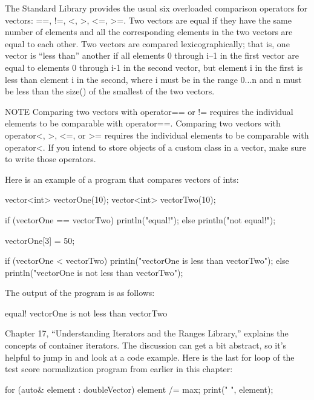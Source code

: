 
The Standard Library provides the usual six overloaded comparison operators for vectors: ==, !=, <, >, <=, >=. Two vectors are equal if they have the same number of elements and all the corresponding elements in the two vectors are equal to each other. Two vectors are compared lexicographically; that is, one vector is “less than” another if all elements 0 through i–1 in the first vector are equal to elements 0 through i-1 in the second vector, but element i in the first is less than element i in the second, where i must be in the range 0...n and n must be less than the size() of the smallest of the two vectors.

\begin{myNotic}{NOTE}
Comparing two vectors with operator== or != requires the individual elements to be comparable with operator==. Comparing two vectors with operator<, >, <=, or >= requires the individual elements to be comparable with operator<. If you intend to store objects of a custom class in a vector, make sure to write those operators.
\end{myNotic}

Here is an example of a program that compares vectors of ints:

\begin{cpp}
vector<int> vectorOne(10);
vector<int> vectorTwo(10);

if (vectorOne == vectorTwo) { println("equal!"); }
else { println("not equal!"); }

vectorOne[3] = 50;

if (vectorOne < vectorTwo) { println("vectorOne is less than vectorTwo"); }
else { println("vectorOne is not less than vectorTwo"); }
\end{cpp}

The output of the program is as follows:

\begin{shell}
equal!
vectorOne is not less than vectorTwo
\end{shell}


Chapter 17, “Understanding Iterators and the Ranges Library,” explains the concepts of container iterators. The discussion can get a bit abstract, so it’s helpful to jump in and look at a code example. Here is the last for loop of the test score normalization program from earlier in this chapter:

\begin{cpp}
for (auto& element : doubleVector) {
    element /= max;
    print("{} ", element);
}
\end{cpp}


